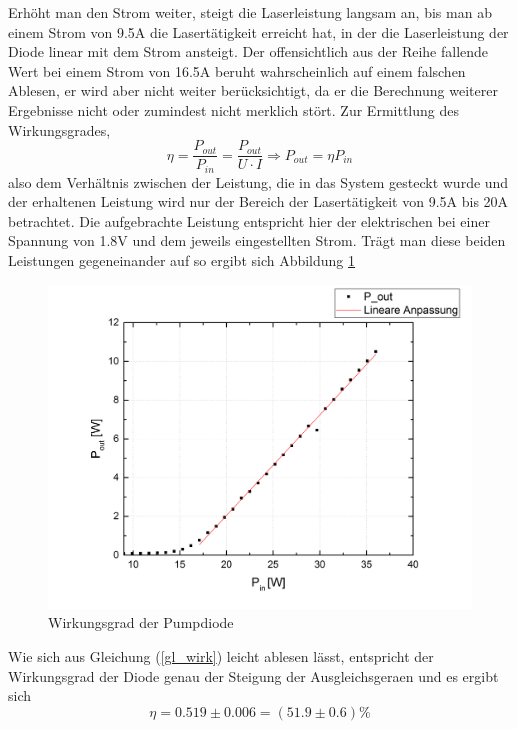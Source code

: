 Erhöht man den Strom weiter, steigt die Laserleistung langsam an, bis man ab einem Strom von 9.5A die Lasertätigkeit erreicht hat, in der die Laserleistung der Diode linear mit dem Strom ansteigt. \newline
Der offensichtlich aus der Reihe fallende Wert bei einem Strom von 16.5A beruht wahrscheinlich auf einem falschen Ablesen, er wird aber nicht weiter berücksichtigt, da er die Berechnung weiterer Ergebnisse nicht oder zumindest nicht merklich stört. \newline
Zur Ermittlung des Wirkungsgrades, 
\begin{equation}
\eta=\frac{P_{out}}{P_{in}}=\frac{P_{out}}{U\cdot I}\Longrightarrow P_{out}=\eta P_{in}
\label{gl_wirk}
\end{equation}
also dem Verhältnis zwischen der Leistung, die in das System gesteckt wurde und der erhaltenen Leistung wird nur der Bereich der Lasertätigkeit von 9.5A bis 20A betrachtet. Die aufgebrachte Leistung entspricht hier der elektrischen bei einer Spannung von 1.8V und dem jeweils eingestellten Strom. Trägt man diese beiden Leistungen gegeneinander auf so ergibt sich \newline Abbildung \ref{wirkung}
\begin{figure}[H]
	\begin{center}
		\includegraphics[scale=.5]{Bilder/Wirkungsgrad.png}
		\caption{Wirkungsgrad der Pumpdiode}
		\label{wirkung}
	\end{center}
\end{figure}
Wie sich aus Gleichung (\ref{gl_wirk}) leicht ablesen lässt, entspricht der Wirkungsgrad der Diode genau der Steigung der Ausgleichsgeraen und es ergibt sich
\begin{equation}
\eta=0.519\pm0.006=(51.9\pm0.6)\%
\end{equation}
